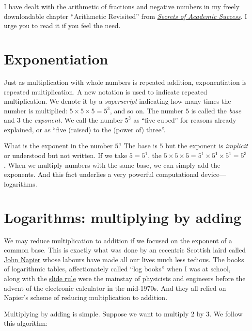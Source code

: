 \documentclass[
  a4paper,
]{article}
\begin{document}
I have dealt with the arithmetic of fractions and negative numbers in my
freely downloadable chapter ``Arithmetic Revisited'' from
\href{https://swanlotus.netlify.app/sas-manuscript/SAS-partial.pdf}{\emph{Secrets
of Academic Success}}. I urge you to read it if you feel the need.

\hypertarget{exponentiation}{%
\section{Exponentiation}\label{exponentiation}}

Just as multiplication with whole numbers is repeated addition,
exponentiation is repeated multiplication. A new notation is used to
indicate repeated multiplication. We denote it by a \emph{superscript}
indicating how many times the number is multiplied:
\(5 \times 5 \times 5 = 5^{3}\), and so on. The number \(5\) is called
the \emph{base} and \(3\) the \emph{exponent}. We call the number
\(5^{3}\) as ``five cubed'' for reasons already explained, or as ``five
(raised) to the (power of) three''.

What is the exponent in the number \(5?\) The base is \(5\) but the
exponent is \emph{implicit} or understood but not written. If we take
\(5 = 5^{1}\), the
\(5 \times 5 \times 5 = 5^{1} \times 5^{1} \times 5^{1} = 5^{3}\). When
we multiply numbers with the same base, we can simply add the exponents.
And this fact underlies a very powerful computational
device---logarithms.

\hypertarget{logarithms-multiplying-by-adding}{%
\section{Logarithms: multiplying by
adding}\label{logarithms-multiplying-by-adding}}

We may reduce multiplication to addition if we focused on the exponent
of a common base. This is exactly what was done by an eccentric Scottish
laird called
\href{http://www-history.mcs.st-andrews.ac.uk/Biographies/Napier.html}{John
Napier} whose labours have made all our lives much less tedious. The
books of logarithmic tables, affectionately called ``log books'' when I
was at school, along with the \href{http://sliderulemuseum.com/}{slide
rule} were the mainstay of physicists and engineers before the advent of
the electronic calculator in the mid-1970s. And they all relied on
Napier's scheme of reducing multiplication to addition.

Multiplying by adding is simple. Suppose we want to multiply \(2\) by
\(3\). We follow this algorithm:
\end{document}
